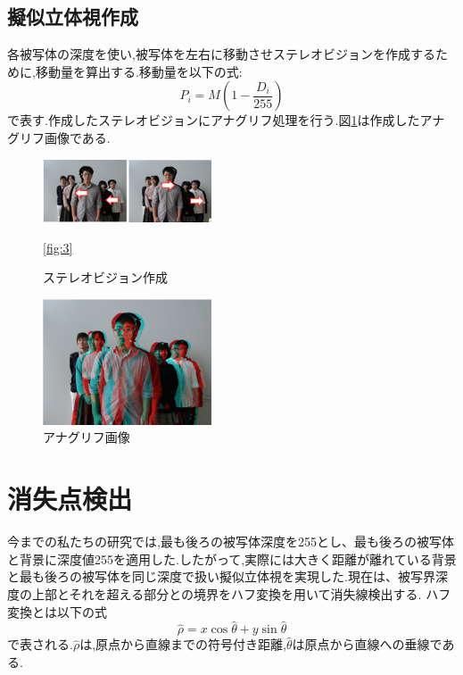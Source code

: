 \documentclass[technicalreport]{ieicej}
\begin{document}
\subsection{擬似立体視作成}
各被写体の深度を使い,被写体を左右に移動させステレオビジョンを作成するために,移動量を算出する.移動量を以下の式:\begin{equation}P_i=M(1-\frac{D_i}{255})\end{equation}で表す.作成したステレオビジョンにアナグリフ処理を行う.図\ref{fig:4}は作成したアナグリフ画像である.
\begin{figure}[t]
\begin{center}
\includegraphics[width=5cm,bb=0 0 1116 418]{fig2.png}
\caption{ステレオビジョン作成}
\ref{fig:3}
\end{center}
\end{figure}

\begin{figure}[t]
\begin{center}
\includegraphics[width=5cm,bb=0 0 738 550]{fig3.png}
\caption{アナグリフ画像}
\label{fig:4}
\end{center}
\end{figure}

\section{消失点検出}
今までの私たちの研究では,最も後ろの被写体深度を255とし、最も後ろの被写体と背景に深度値255を適用した.したがって,実際には大きく距離が離れている背景と最も後ろの被写体を同じ深度で扱い擬似立体視を実現した.現在は、被写界深度の上部とそれを超える部分との境界をハフ変換を用いて消失線検出する.
ハフ変換とは以下の式\begin{equation}\hat \rho=x \cos \hat \theta +y \sin \hat \theta \end{equation}で表される.$\hat \rho$は,原点から直線までの符号付き距離,$\hat \theta$は原点から直線への垂線である.
\end{document}
